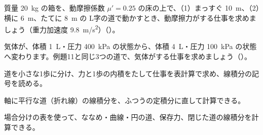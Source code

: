 \bkproblem 質量 \qty{20}{kg} の箱を、動摩擦係数 $\mu'=0.25$ の床の上で、（1）まっすぐ \qty{10}{m}、（2）横に \qty{6}{m}、たてに \qty{8}{m} の L字の道で動かすとき、動摩擦力がする仕事を求めましょう（重力加速度 \qty{9.8}{m/s^2}）\mbox{（）}。

\bkproblem 気体が、体積 \qty{1}{L}・圧力 \qty{400}{kPa} の状態から、体積 \qty{4}{L}・圧力 \qty{100}{kPa} の状態へ変わります。例題11と同じ3つの道で、気体がする仕事を求めましょう\mbox{（）}。

\begin{furikaeri}
\begin{checklist}
\item 道を小さな1歩に分け、力と1歩の内積をたして仕事を表計算で求め、線積分の記号を読める。
\item 軸に平行な道（折れ線）の線積分を、ふつうの定積分に直して計算できる。
\item 場合分けの表を使って、ななめ・曲線・円の道、保存力、閉じた道の線積分を計算できる。
\end{checklist}
\end{furikaeri}

